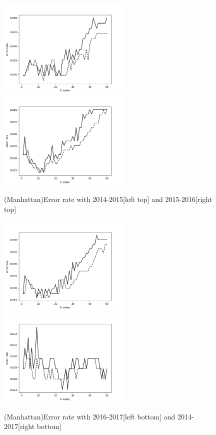 \documentclass{article}
\begin{document}
\begin{figure}[hbt!]
  \centering
  \includegraphics[width=6.3cm]{knn_err14_ma.png}
  \includegraphics[width=6.3cm]{knn_err15_ma.png}
  \caption{(Manhattan)Error rate with 2014-2015[left top] and 2015-2016[right top]}
  \includegraphics[width=6.3cm]{knn_err16_ma.png}
  \includegraphics[width=6.3cm]{knn_errall_ma.png}
  \caption{(Manhattan)Error rate with 2016-2017[left bottom] and 2014-2017[right bottom]}
\end{figure}
\end{document}
